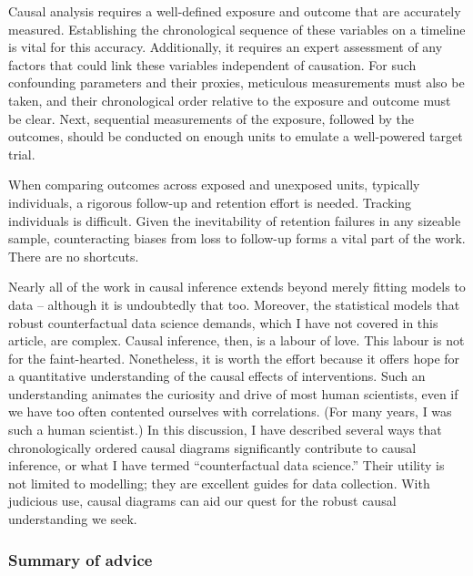 \documentclass[
  singlecolumn]{article}
\begin{document}
Causal analysis requires a well-defined exposure and outcome that are
accurately measured. Establishing the chronological sequence of these
variables on a timeline is vital for this accuracy. Additionally, it
requires an expert assessment of any factors that could link these
variables independent of causation. For such confounding parameters and
their proxies, meticulous measurements must also be taken, and their
chronological order relative to the exposure and outcome must be clear.
Next, sequential measurements of the exposure, followed by the outcomes,
should be conducted on enough units to emulate a well-powered target
trial.

When comparing outcomes across exposed and unexposed units, typically
individuals, a rigorous follow-up and retention effort is needed.
Tracking individuals is difficult. Given the inevitability of retention
failures in any sizeable sample, counteracting biases from loss to
follow-up forms a vital part of the work. There are no shortcuts.

Nearly all of the work in causal inference extends beyond merely fitting
models to data -- although it is undoubtedly that too. Moreover, the
statistical models that robust counterfactual data science demands,
which I have not covered in this article, are complex. Causal inference,
then, is a labour of love. This labour is not for the faint-hearted.
Nonetheless, it is worth the effort because it offers hope for a
quantitative understanding of the causal effects of interventions. Such
an understanding animates the curiosity and drive of most human
scientists, even if we have too often contented ourselves with
correlations. (For many years, I was such a human scientist.) In this
discussion, I have described several ways that chronologically ordered
causal diagrams significantly contribute to causal inference, or what I
have termed ``counterfactual data science.'' Their utility is not
limited to modelling; they are excellent guides for data collection.
With judicious use, causal diagrams can aid our quest for the robust
causal understanding we seek.

\hypertarget{summary-of-advice}{%
\subsubsection{Summary of advice}\label{summary-of-advice}}
\end{document}
